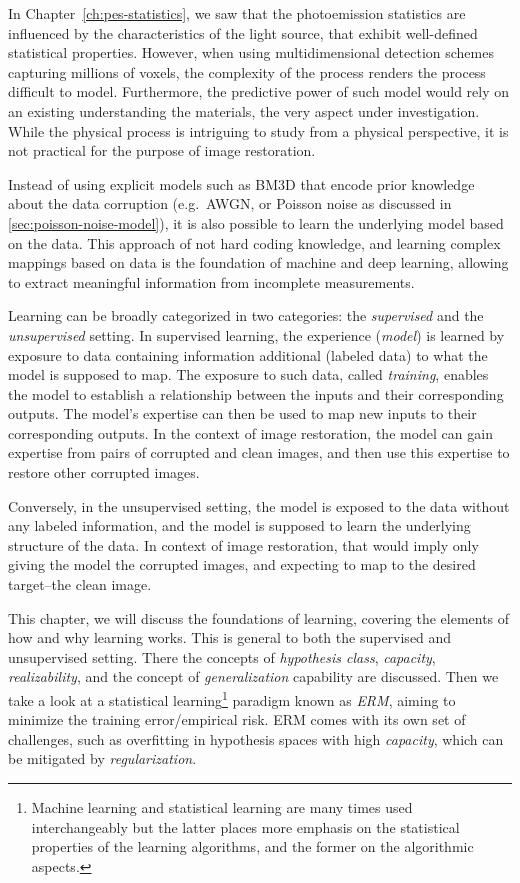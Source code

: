In Chapter~\ref{ch:pes-statistics}, we saw that the photoemission statistics are influenced by the characteristics of the light source, that exhibit well-defined statistical properties. However, when using multidimensional detection schemes capturing millions of voxels, the complexity of the process renders the process difficult to model. Furthermore, the predictive power of such model would rely on an existing understanding the materials, the very aspect under investigation. While the physical process is intriguing to study from a physical perspective, it is not practical for the purpose of image restoration.

Instead of using explicit models such as \gls{BM3D} that encode prior knowledge about the data corruption (e.g.\ \gls{AWGN}, or Poisson noise as discussed in \cref{sec:poisson-noise-model}), it is also possible to learn the underlying model based on the data. This approach of not hard coding knowledge, and learning complex mappings based on data is the foundation of machine and deep learning, allowing to extract meaningful information from incomplete measurements.

Learning can be broadly categorized in two categories: the \textit{supervised} and the \textit{unsupervised} setting. In supervised learning, the experience (\textit{model}) is learned by exposure to data containing information additional (labeled data) to what the model is supposed to map. The exposure to such data, called \textit{training}, enables the model to establish a relationship between the inputs and their corresponding outputs. The model’s expertise can then be used to map new inputs to their corresponding outputs. In the context of image restoration, the model can gain expertise from pairs of corrupted and clean images, and then use this expertise to restore other corrupted images.

Conversely, in the unsupervised setting, the model is exposed to the data without any labeled information, and the model is supposed to learn the underlying structure of the data. In context of image restoration, that would imply only giving the model the corrupted images, and expecting to map to the desired target--the clean image.

This chapter, we will discuss the foundations of learning, covering the elements of how and why learning works. This is general to both the supervised and unsupervised setting. There the concepts of \textit{hypothesis class}, \textit{capacity}, \textit{realizability}, and the concept of \textit{generalization} capability are discussed. Then we take a look at a statistical learning\footnote{Machine learning and statistical learning are many times used interchangeably but the latter places more emphasis on the statistical properties of the learning algorithms, and the former on the algorithmic aspects.} paradigm known as \textit{\gls{ERM}}, aiming to minimize the training error/empirical risk. \Gls{ERM} comes with its own set of challenges, such as overfitting in hypothesis spaces with high \textit{capacity}, which can be mitigated by \textit{regularization}. 

